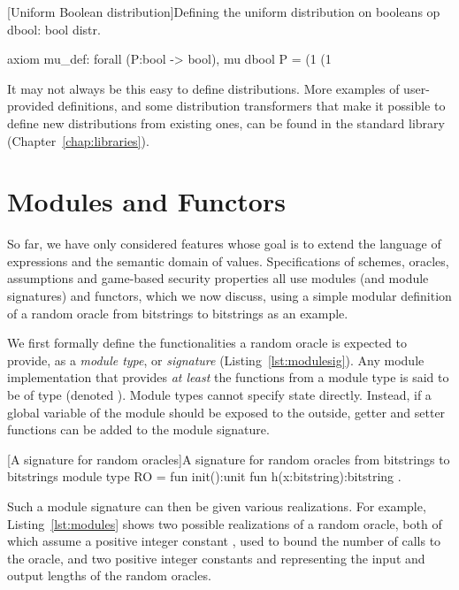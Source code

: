 \begin{easycrypt}[label={lst:dbool}]{[Uniform Boolean distribution]Defining the uniform distribution on booleans}
op dbool: bool distr.

axiom mu_def: forall (P:bool -> bool), 
  mu dbool P =
    (1%
    (1%
\end{easycrypt}

It may not always be this easy to define distributions. More examples of
user-provided definitions, and some distribution transformers that make it
possible to define new distributions from existing ones, can be found in the
standard library (Chapter~\ref{chap:libraries}).


\section{Modules and Functors\label{sec:modules}}

So far, we have only considered features whose goal is to extend the language of
expressions and the semantic domain of values. Specifications of schemes,
oracles, assumptions and game-based security properties all use modules (and
module signatures) and functors, which we now discuss, using a simple modular
definition of a random oracle from bitstrings to bitstrings as an example.

We first formally define the functionalities a random oracle is expected to
provide, as a \emph{module type}, or \emph{signature}
(Listing~\ref{lst:modulesig}). Any module implementation  that provides
\emph{at least} the functions from a module type  is said to be of
type  (denoted ). Module types cannot specify state
directly. Instead, if a global variable of the module should be exposed to the
outside, getter and setter functions can be added to the module signature.

\begin{easycrypt}[label={lst:modulesig}]{[A signature for random oracles]A signature for random oracles from bitstrings to bitstrings}
module type RO = {
  fun init():unit
  fun h(x:bitstring):bitstring }.
\end{easycrypt}

Such a module signature can then be given various realizations. For example, Listing~\ref{lst:modules} shows two possible realizations of a random oracle, both of which assume a positive integer constant , used to bound the number of calls to the oracle, and two positive integer constants  and  representing the input and output lengths of the random oracles.

